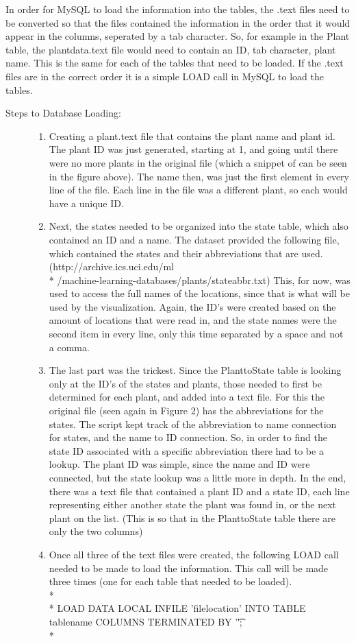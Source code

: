 \documentclass{Group6_Phase2}
\begin{document}
In order for MySQL to load the information into the tables, the .text files need to be converted so that the files contained the information in the order that it would appear in the columns, seperated by a tab character. So, for example in the Plant table, the plantdata.text file would need to contain an ID, tab character, plant name. This is the same for each of the tables that need to be loaded. If the .text files are in the correct order it is a simple LOAD call in MySQL to load the tables. 


\begin{description}
	\item[Steps to Database Loading:] \hfill
	\begin{enumerate}
		\item Creating a plant.text file that contains the plant name and plant id. The plant ID was just generated, starting at 1, and going until there were no more plants in the original file (which a snippet of can be seen in the figure above). The name then, was just the first element in every line of the file. Each line in the file was a different plant, so each would have a unique ID.
		\item Next, the states needed to be organized into the state table, which also contained an ID and a name. The dataset provided the following file, which contained the states and their abbreviations that are used. (http://archive.ics.uci.edu/ml \\* /machine-learning-databases/plants/stateabbr.txt) This, for now, was used to access the full names of the locations, since that is what will be used by the visualization. Again, the ID's were created based on the amount of locations that were read in, and the state names were the second item in every line, only this time separated by a space and not a comma. 
		\item The last part was the trickest. Since the PlanttoState table is looking only at the ID's of the states and plants, those needed to first be determined for each plant, and added into a text file. For this the original file (seen again in Figure 2) has the abbreviations for the states. The script kept track of the abbreviation to name connection for states, and the name to ID connection. So, in order to find the state ID associated with a specific abbreviation there had to be a lookup. The plant ID was simple, since the name and ID were connected, but the state lookup was a little more in depth. In the end, there was a text file that contained a plant ID and a state ID, each line representing either another state the plant was found in, or the next plant on the list. (This is so that in the PlanttoState table there are only the two columns)
		\item Once all three of the text files were created, the following LOAD call needed to be made to load the information. This call will be made three times (one for each table that needed to be loaded). \\* \\* LOAD DATA LOCAL INFILE 'filelocation' INTO TABLE tablename COLUMNS TERMINATED BY '\t'; \\*
	\end{enumerate}
\end{description}
\end{document}
